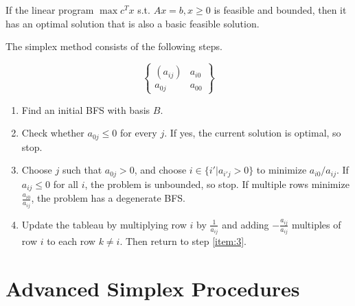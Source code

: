 \begin{thm}
  \label{sec:simplex-method-4}
  If the linear program $\max c^{T} x$ s.t. $Ax = b, x \geq 0$ is
  feasible and bounded, then it has an optimal solution that is also a
  basic feasible solution.
\end{thm}



\begin{defn}
  \label{sec:simplex-method-1}
  The simplex method consists of the following steps.

  \begin{equation}
    \label{eq:4}
    \begin{Bmatrix}
      (a_{ij}) & a_{i0} \\
      a_{0j} & a_{00}
    \end{Bmatrix}
  \end{equation}

  \begin{enumerate}
  \item\label{item:2} Find an initial BFS with basis $B$.
  \item\label{item:3} Check whether $a_{0j} \leq 0$ for every $j$.  If yes, the
    current solution is optimal, so stop.
  \item\label{item:4} Choose $j$ such that $a_{0j} > 0$, and choose $i \in \{ i' |
    a_{i'j} > 0 \} $ to minimize $a_{i0} / a_{ij}$.  If $a_{ij} \leq
    0$ for all $i$, the problem is unbounded, so stop.  If multiple
    rows minimize $\frac{a_{i0}}{a_{ij}}$, the problem has a
    degenerate BFS.
  \item\label{item:5} Update the tableau by multiplying row $i$ by
    $\frac{1}{a_{ij}}$ and adding $-\frac{a_{ij}}{a_{ij}}$ multiples
    of row $i$ to each row $k \neq i$. Then return to step \ref{item:3}.
  \end{enumerate}
\end{defn}



\section{Advanced Simplex Procedures}
\label{sec:advanc-simpl-proc}

